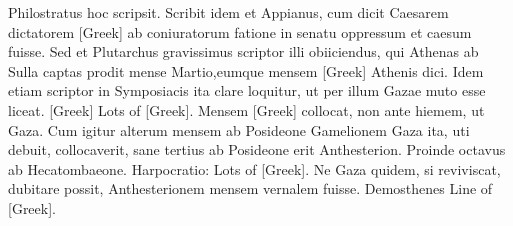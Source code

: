 Philostratus hoc scripsit.
Scribit idem et Appianus, cum dicit Caesarem
dictatorem \textgreek{[Greek]} ab coniuratorum fatione in senatu
oppressum et caesum fuisse.
Sed et Plutarchus gravissimus scriptor illi
obiiciendus, qui Athenas ab Sulla captas prodit mense Martio,eumque
mensem \textgreek{[Greek]} Athenis dici.
Idem etiam scriptor in Symposiacis
ita clare loquitur, ut per illum Gazae muto esse liceat.
 \textgreek{[Greek]}
\textgreek{Lots of [Greek]}.
Mensem
\textgreek{[Greek]} collocat, non ante hiemem, ut Gaza.
Cum
igitur alterum mensem ab Posideone Gamelionem Gaza ita, uti debuit,
collocaverit, sane tertius ab Posideone erit Anthesterion.
Proinde octavus
ab Hecatombaeone.
Harpocratio: \textgreek{Lots of [Greek]}.
Ne Gaza quidem, si reviviscat, dubitare
possit, Anthesterionem mensem vernalem fuisse.
Demosthenes
\textgreek{Line of [Greek]}.

